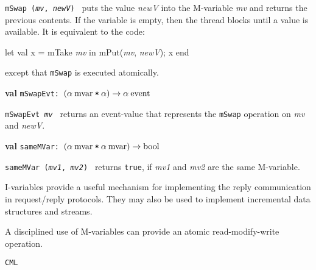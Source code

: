 \begin{descr}
\begin{speccomment}
\item {\tt m\-Swap (\textit{mv}, \textit{new\-V})           } 
puts the value \textit{new\-V} into the M-variable \textit{mv} and returns 	  the previous contents.\- 	  If the variable is empty, then the thread blocks until 	  a value is available.\- 	  It is equivalent to the code: 	  
\begin{code}
let val x = mTake \textit{mv} in mPut(\textit{mv}, \textit{new\-V}); x end
	  
\end{code}
 	  except that {\tt m\-Swap} is executed atomically.\-     \end{speccomment}
\item {}{\textbf{val}} {\tt mSwapEvt: \((\alpha\:\mathrm{mvar}\:\verb,*,\:\alpha)\rightarrow \alpha\:\mathrm{event}\)}\label{val-SYNC_VAR.mSwapEvt}


\begin{speccomment}
\item {\tt m\-Swap\-Evt \textit{mv}           } 
returns an event-value that represents the \texttt{m\-Swap} 	  operation on \textit{mv} and \textit{new\-V}.\-     \end{speccomment}
\item {}{\textbf{val}} {\tt sameMVar: \((\alpha\:\mathrm{mvar}\:\verb,*,\:\alpha\:\mathrm{mvar})\rightarrow \mathrm{bool}\)}\label{val-SYNC_VAR.sameMVar}


\begin{speccomment}
\item {\tt same\-MVar (\textit{mv1}, \textit{mv2})           } 
returns {\tt true}, if \textit{mv1} and \textit{mv2} are the same 	  M-variable.\-   \end{speccomment}
\end{descr}


I-variables provide a useful mechanism for implementing the reply communication in request/reply protocols.\- They may also be used to implement incremental data structures and streams.\-

A disciplined use of M-variables can provide an atomic read-modify-write operation.\-
\begin{seealso}
\texttt{CML}
\end{seealso}
